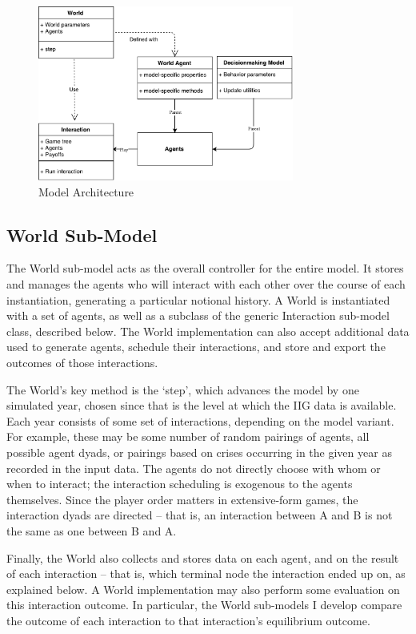 \begin{figure}[h!]
    \centering
	\includegraphics[width=0.75\textwidth]{WarReason/Figures/ModelArchitecture}
    \caption{Model Architecture}
    \label{fig:model_architecture}
    \figSpace
\end{figure}

\subsection{World Sub-Model}

The World sub-model acts as the overall controller for the entire model. It stores and manages the agents who will interact with each other over the course of each instantiation, generating a particular notional history. A World is instantiated with a set of agents, as well as a subclass of the generic Interaction sub-model class, described below. The World implementation can also accept additional data used to generate agents, schedule their interactions, and store and export the outcomes of those interactions.

The World's key method is the `step', which advances the model by one simulated year, chosen since that is the level at which the IIG data is available. Each year consists of some set of interactions, depending on the model variant. For example, these may be some number of random pairings of agents, all possible agent dyads, or pairings based on crises occurring in the given year as recorded in the input data. The agents do not directly choose with whom or when to interact; the interaction scheduling is exogenous to the agents themselves. Since the player order matters in extensive-form games, the interaction dyads are directed -- that is, an interaction between A and B is not the same as one between B and A.

Finally, the World also collects and stores data on each agent, and on the result of each interaction -- that is, which terminal node the interaction ended up on, as explained below. A World implementation may also perform some evaluation on this interaction outcome. In particular, the World sub-models I develop compare the outcome of each interaction to that interaction's equilibrium outcome.

